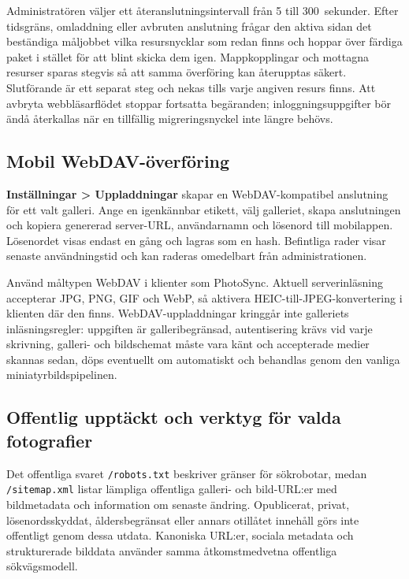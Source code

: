 \documentclass[11pt,a4paper]{article}
\newcommand{\ui}[1]{\textbf{#1}}
\newcommand{\codeword}[1]{\nolinkurl{#1}}
\begin{document}
Administratören väljer ett återanslutningsintervall från 5 till 300~sekunder.
Efter tidsgräns, omladdning eller avbruten anslutning frågar den aktiva sidan
det beständiga måljobbet vilka resursnycklar som redan finns och hoppar över
färdiga paket i stället för att blint skicka dem igen. Mappkopplingar och
mottagna resurser sparas stegvis så att samma överföring kan återupptas säkert.
Slutförande är ett separat steg och nekas tills varje angiven resurs finns. Att
avbryta webbläsarflödet stoppar fortsatta begäranden; inloggningsuppgifter bör
ändå återkallas när en tillfällig migreringsnyckel inte längre behövs.

\subsection{Mobil WebDAV-överföring}

\ui{Inställningar > Uppladdningar} skapar en WebDAV-kompatibel anslutning för
ett valt galleri. Ange en igenkännbar etikett, välj galleriet, skapa
anslutningen och kopiera genererad server-URL, användarnamn och lösenord till
mobilappen. Lösenordet visas endast en gång och lagras som en hash. Befintliga
rader visar senaste användningstid och kan raderas omedelbart från
administrationen.

Använd måltypen WebDAV i klienter som PhotoSync. Aktuell serverinläsning
accepterar JPG, PNG, GIF och WebP, så aktivera HEIC-till-JPEG-konvertering i
klienten där den finns. WebDAV-uppladdningar kringgår inte galleriets
inläsningsregler: uppgiften är galleribegränsad, autentisering krävs vid varje
skrivning, galleri- och bildschemat måste vara känt och accepterade medier
skannas sedan, döps eventuellt om automatiskt och behandlas genom den vanliga
miniatyrbildspipelinen.

\subsection{Offentlig upptäckt och verktyg för valda fotografier}

Det offentliga svaret \codeword{/robots.txt} beskriver gränser för sökrobotar,
medan \codeword{/sitemap.xml} listar lämpliga offentliga galleri- och
bild-URL:er med bildmetadata och information om senaste ändring. Opublicerat,
privat, lösenordsskyddat, åldersbegränsat eller annars otillåtet innehåll görs
inte offentligt genom dessa utdata. Kanoniska URL:er, sociala metadata och
strukturerade bilddata använder samma åtkomstmedvetna offentliga sökvägsmodell.
\end{document}
